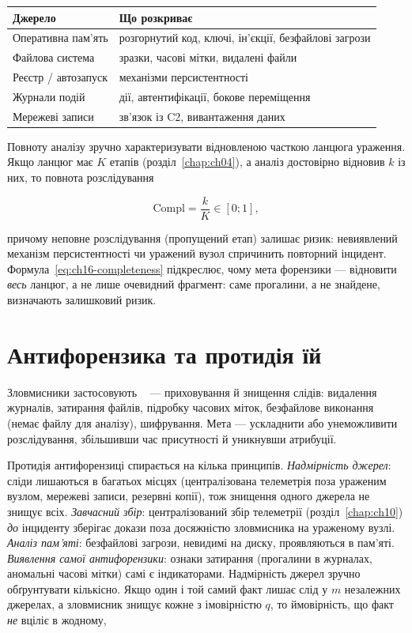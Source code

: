 \begin{center}\footnotesize
\begin{tabularx}{\linewidth}{L{22mm} Y}
\toprule
Джерело & Що розкриває \\
\midrule
Оперативна пам'ять & розгорнутий код, ключі, ін'єкції, безфайлові загрози \\
Файлова система & зразки, часові мітки, видалені файли \\
Реєстр / автозапуск & механізми персистентності \\
Журнали подій & дії, автентифікації, бокове переміщення \\
Мережеві записи & зв'язок із C2, вивантаження даних \\
\bottomrule
\end{tabularx}
\end{center}

Повноту аналізу зручно характеризувати відновленою часткою ланцюга ураження. Якщо ланцюг має $K$ етапів (розділ~\ref{chap:ch04}), а аналіз достовірно відновив $k$ із них, то повнота розслідування

\begin{equation}
\mathrm{Compl} = \frac{k}{K} \in [0;1],
\label{eq:ch16-completeness}
\end{equation}

причому неповне розслідування (пропущений етап) залишає ризик: невиявлений механізм персистентності чи уражений вузол спричинить повторний інцидент. Формула~\eqref{eq:ch16-completeness} підкреслює, чому мета форензики --- відновити \emph{весь} ланцюг, а не лише очевидний фрагмент: саме прогалини, а не знайдене, визначають залишковий ризик.

\section{Антифорензика та протидія їй}\label{sec:ch16-antiforensics}

Зловмисники застосовують ~\cite{ch16:antiforensics} --- приховування й знищення слідів: видалення журналів, затирання файлів, підробку часових міток, безфайлове виконання (немає файлу для аналізу), шифрування. Мета --- ускладнити або унеможливити розслідування, збільшивши час присутності й уникнувши атрибуції.

Протидія антифорензиці спирається на кілька принципів. \emph{Надмірність джерел}: сліди лишаються в багатьох місцях (централізована телеметрія поза ураженим вузлом, мережеві записи, резервні копії), тож знищення одного джерела не знищує всіх. \emph{Завчасний збір}: централізований збір телеметрії (розділ~\ref{chap:ch10}) \emph{до} інциденту зберігає докази поза досяжністю зловмисника на ураженому вузлі. \emph{Аналіз пам'яті}: безфайлові загрози, невидимі на диску, проявляються в пам'яті. \emph{Виявлення самої антифорензики}: ознаки затирання (прогалини в журналах, аномальні часові мітки) самі є індикаторами. Надмірність джерел зручно обґрунтувати кількісно. Якщо один і той самий факт лишає слід у $m$ незалежних джерелах, а зловмисник знищує кожне з імовірністю $q$, то ймовірність, що факт \emph{не} вціліє в жодному,


